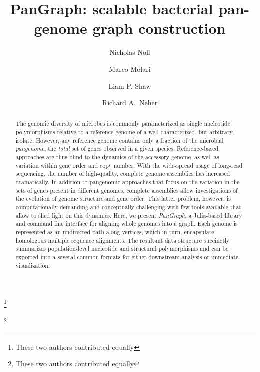 \documentclass[aps,rmp,preprint,superscriptaddress,10pt,linenumbers]{revtex4-1}
\begin{document}
\title{PanGraph: scalable bacterial pan-genome graph construction}
\author{Nicholas Noll}
\thanks{These two authors contributed equally}
\author{Marco Molari}
\thanks{These two authors contributed equally}
\author{Liam P. Shaw}
\author{Richard A.~Neher}

\begin{abstract}
    The genomic diversity of microbes is commonly parameterized as single nucleotide polymorphisms relative to a reference genome of a well-characterized, but arbitrary, isolate.
    However, any reference genome contains only a fraction of the microbial \emph{pangenome}, the \textit{total} set of genes observed in a given species.
    Reference-based approaches are thus blind to the dynamics of the accessory genome, as well as variation within gene order and copy number.
    With the wide-spread usage of long-read sequencing, the number of high-quality, complete genome assemblies has increased dramatically.
    In addition to pangenomic approaches that focus on the variation in the sets of genes present in different genomes, complete assemblies allow investigations of the evolution of genome structure and gene order.
    This latter problem, however, is computationally demanding and conceptually challenging with few tools available that allow to shed light on this dynamics. 
    Here, we present \emph{PanGraph}, a Julia-based library and command line interface for aligning whole genomes into a graph.
    Each genome is represented as an undirected path along vertices, which in turn, encapsulate homologous multiple sequence alignments.
    The resultant data structure succinctly summarizes population-level nucleotide and structural polymorphisms and can be exported into a several common formats for either downstream analysis or immediate visualization.
\end{abstract}
\end{document}
